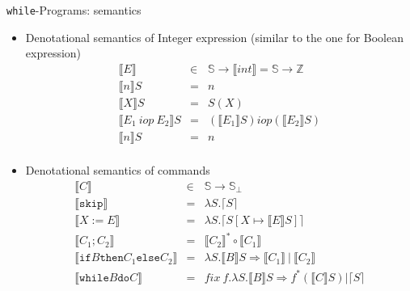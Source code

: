 \documentclass[11pt]{beamer}
\newcommand{\Z}{\mathbb{Z}}
\newcommand{\St}{\mathbb{S}}
\newcommand{\bbracket}[1]{\llbracket #1 \rrbracket}
\newcommand{\cceil}[1]{\lceil #1 \rceil}
\begin{document}
\begin{frame}{\texttt{while}-Programs: semantics}
\begin{itemize}
\item Denotational semantics of Integer expression (similar to the one for Boolean expression)
$$
\begin{array}{rcl}
\bbracket{E} &\in& \St \rightarrow \bbracket{int}=\St \rightarrow \Z\\
\bbracket{n}S &=& n\\
\bbracket{X}S &=& S(X)\\
\bbracket{E_1~iop~E_2}S &=& (\bbracket{E_1}S)iop(\bbracket{E_2}S)\\
\bbracket{n}S &=& n\\
\end{array}
$$
\item Denotational semantics of commands 
$$
\begin{array}{rcl}
\bbracket{C}&\in& \St \rightarrow \St_\perp\\
\bbracket{\texttt{skip}} &=& \lambda S.\cceil{S}\\
\bbracket{X:=E} &=& \lambda S.\cceil{S[X \mapsto \bbracket{E}S]}\\
\bbracket{C_1;C_2} &=& \bbracket{C_2}^*\circ\bbracket{C_1}\\
\bbracket{\texttt{if} B \texttt{then} C_1 \texttt{else} C_2} &=& \lambda S.\bbracket{B}S \Rightarrow \bbracket{C_1}~|~\bbracket{C_2}\\
\bbracket{\texttt{while}B\texttt{do}C} &=& fix~f.\lambda S.\bbracket{B}S \Rightarrow f^*(\bbracket{C}S)|\cceil{S}\\
\end{array}
$$
\end{itemize}
\end{frame}

\end{document}
